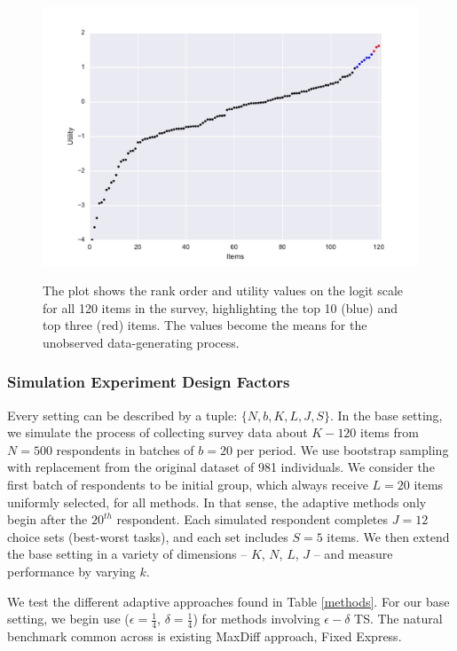 \documentclass[nonblindrev]{informs3}
\newcommand{\numperset}{L}
\begin{document}
\begin{figure}[!ht]
\caption{The plot shows the rank order and utility values on the logit scale for all 120 items in the survey, highlighting the top 10 (blue) and top three (red) items. The values become the means for the unobserved data-generating process.}
\includegraphics[width=1\textwidth]{plots/utilscore.pdf}
\label{fig:util} 
\end{figure}

\subsubsection{Simulation Experiment Design Factors}


Every setting can be described by a tuple: $\{N,b,K,\numperset,J,S\}$. In the base setting, we simulate the process of collecting survey data about $K-120$ items from $N=500$ respondents in batches of $b=20$ per period. We use bootstrap sampling with replacement from the original dataset of 981 individuals. We consider the first batch of respondents to be initial group, which always receive $\numperset=20$ items uniformly selected, for all methods. In that sense, the adaptive methods only begin after the $20^{th}$ respondent. Each simulated respondent completes $J=12$ choice sets (best-worst tasks), and each set includes $S=5$ items. We then extend the base setting in a variety of dimensions -- $K$, $N$, $\numperset$, $J$ -- and measure performance by varying $k$.

We test the different adaptive approaches found in Table \ref{methods}. For our base setting, we begin use ($\epsilon=\frac{1}{4}$, $\delta=\frac{1}{4}$) for methods involving $\epsilon-\delta$ TS. The natural benchmark common across is existing MaxDiff approach, Fixed Express.
\end{document}
